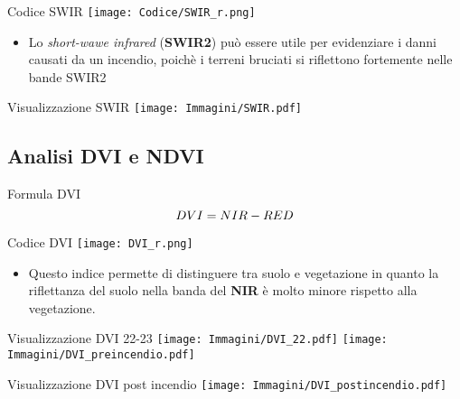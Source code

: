 \documentclass{beamer}
\begin{document}
\begin{frame}{Codice SWIR}
\texttt{[image: Codice/SWIR\_r.png]}
\centering
\begin{itemize}
    \item Lo \textit{short-wawe infrared} (\textbf{SWIR2}) può essere utile per evidenziare i danni causati da un incendio, poichè i terreni bruciati si riflettono fortemente nelle bande SWIR2
\end{itemize}
\end{frame}

\begin{frame}{Visualizzazione SWIR}
 \texttt{[image: Immagini/SWIR.pdf]}
 \caption{Immagini in SWIR del 2022, 2023 (pre-incendio), 2023 (post incendio)}
    \centering
    \end{frame}

\subsection{Analisi DVI e NDVI}


\begin{frame}{Formula DVI}
\begin{equation}
    DVI = NIR - RED
    \centering
    \end{equation}
\end{frame}

\begin{frame}{Codice DVI}
\texttt{[image: DVI\_r.png]}
    \begin{itemize}
\item Questo indice permette di distinguere tra suolo e vegetazione in quanto la riflettanza del suolo nella banda del \textbf{NIR} è molto minore rispetto alla vegetazione.
\end{itemize}    
\end{frame}

\begin{frame}{Visualizzazione DVI 22-23}
    \texttt{[image: Immagini/DVI\_22.pdf]}
    \texttt{[image: Immagini/DVI\_preincendio.pdf]}
\end{frame}

\begin{frame}{Visualizzazione DVI post incendio}
\texttt{[image: Immagini/DVI\_postincendio.pdf]}
\centering
    \end{frame}
\end{document}

